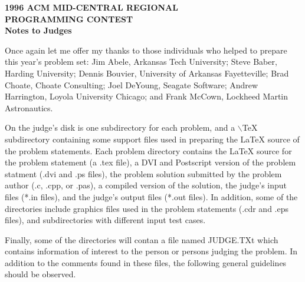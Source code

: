 


\thispagestyle{empty}

\begin{center}
\large\bf 1996 ACM MID-CENTRAL REGIONAL\\ PROGRAMMING CONTEST\\[\bigskipamount]
\Large\bf Notes to Judges
\end{center}

\bigskip\bigskip\bigskip

Once again let me offer my thanks to those individuals who helped to
prepare this year's problem set: Jim Abele, Arkansas Tech University;
Steve Baber, Harding University; Dennis Bouvier, University of
Arkansas Fayetteville; Brad Choate, Choate Consulting; Joel DeYoung,
Seagate Software; Andrew Harrington, Loyola University Chicago; and
Frank McCown, Lockheed Martin Astronautics.

On the judge's disk is one subdirectory for each problem, and a
$\backslash$TeX subdirectory containing some support files used in
preparing the \LaTeX{} source of the problem statements.  Each problem
directory contains the \LaTeX{} source for the problem statement (a
.tex file), a DVI and Postscript version of the problem statment (.dvi
and .ps files), the problem solution submitted by the problem author
(.c, .cpp, or .pas), a compiled version of the solution, the judge's
input files (*.in files), and the judge's output files (*.out files).
In addition, some of the directories include graphics files used in
the problem statements (.cdr and .eps files), and subdirectories with
different input test cases.

Finally, some of the directories will contan a file named JUDGE.TXt
which contains information of interest to the person or persons
judging the problem.  In addition to the comments found in these
files, the following general guidelines should be observed.

